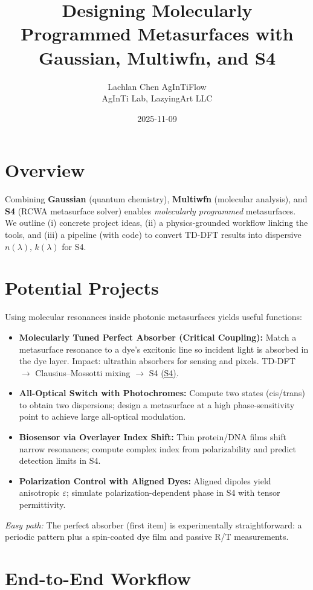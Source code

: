 \documentclass[11pt,a4paper]{article}
\title{Designing Molecularly Programmed Metasurfaces with Gaussian, Multiwfn, and S4}
\author{\begin{tabular}{c}Lachlan Chen \quad AgInTiFlow\\AgInTi Lab, LazyingArt LLC\end{tabular}}
\date{2025-11-09}
\begin{document}
\maketitle

\section{Overview}
Combining \textbf{Gaussian} (quantum chemistry), \textbf{Multiwfn} (molecular analysis), and \textbf{S4} (RCWA metasurface solver) enables \emph{molecularly programmed} metasurfaces. We outline (i) concrete project ideas, (ii) a physics-grounded workflow linking the tools, and (iii) a pipeline (with code) to convert TD-DFT results into dispersive $n(\lambda),\,k(\lambda)$ for S4.

\section{Potential Projects}
Using molecular resonances inside photonic metasurfaces yields useful functions:
\begin{itemize}
  \item \textbf{Molecularly Tuned Perfect Absorber (Critical Coupling):} Match a metasurface resonance to a dye's excitonic line so incident light is absorbed in the dye layer. Impact: ultrathin absorbers for sensing and pixels. TD-DFT $\to$ Clausius--Mossotti mixing $\to$ S4 \href{https://web.stanford.edu/group/fan/publication/Liu_ComputerPhysicsCommunications_183_2233_2012.pdf}{(S4)}.
  \item \textbf{All-Optical Switch with Photochromes:} Compute two states (cis/trans) to obtain two dispersions; design a metasurface at a high phase-sensitivity point to achieve large all-optical modulation.
  \item \textbf{Biosensor via Overlayer Index Shift:} Thin protein/DNA films shift narrow resonances; compute complex index from polarizability and predict detection limits in S4.
  \item \textbf{Polarization Control with Aligned Dyes:} Aligned dipoles yield anisotropic $\varepsilon$; simulate polarization-dependent phase in S4 with tensor permittivity.
\end{itemize}
\textit{Easy path:} The perfect absorber (first item) is experimentally straightforward: a periodic pattern plus a spin-coated dye film and passive R/T measurements.

\section{End-to-End Workflow}
\end{document}
